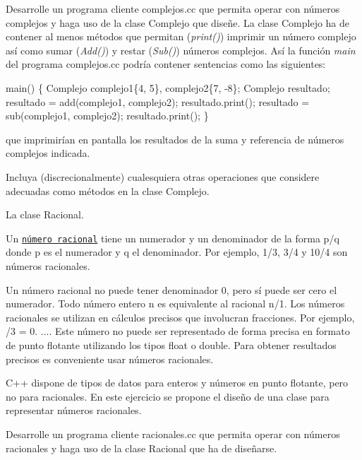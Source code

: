 Desarrolle un programa cliente {\ttfamily complejos.\+cc} que permita operar con números complejos y haga uso de la clase {\ttfamily Complejo} que diseñe. La clase {\ttfamily Complejo} ha de contener al menos métodos que permitan ({\itshape print()}) imprimir un número complejo así como sumar ({\itshape Add()}) y restar ({\itshape Sub()}) números complejos. Así la función {\itshape main} del programa {\ttfamily complejos.\+cc} podría contener sentencias como las siguientes\+:


\begin{DoxyCode}
main() \{
  Complejo complejo1\{4, 5\}, complejo2\{7, -8\};
  Complejo resultado;
  resultado = add(complejo1, complejo2);
  resultado.print();
  resultado = sub(complejo1, complejo2);
  resultado.print();
\}
\end{DoxyCode}
 que imprimirían en pantalla los resultados de la suma y referencia de números complejos indicada.

Incluya (discrecionalmente) cualesquiera otras operaciones que considere adecuadas como métodos en la clase {\ttfamily Complejo}.


\begin{DoxyEnumerate}
\item La clase Racional.
\end{DoxyEnumerate}

Un \href{https://en.wikipedia.org/wiki/Rational_number}{\tt número racional} tiene un numerador y un denominador de la forma {\ttfamily p/q} donde {\ttfamily p} es el numerador y {\ttfamily q} el denominador. Por ejemplo, 1/3, 3/4 y 10/4 son números racionales.

Un número racional no puede tener denominador 0, pero sí puede ser cero el numerador. Todo número entero {\ttfamily n} es equivalente al racional {\ttfamily n/1}. Los números racionales se utilizan en cálculos precisos que involucran fracciones. Por ejemplo, {/3 = 0. ...}. Este número no puede ser representado de forma precisa en formato de punto flotante utilizando los tipos float o double. Para obtener resultados precisos es conveniente usar números racionales.

C++ dispone de tipos de datos para enteros y números en punto flotante, pero no para racionales. En este ejercicio se propone el diseño de una clase para representar números racionales.

Desarrolle un programa cliente {\ttfamily racionales.\+cc} que permita operar con números racionales y haga uso de la clase {\ttfamily Racional} que ha de diseñarse.

